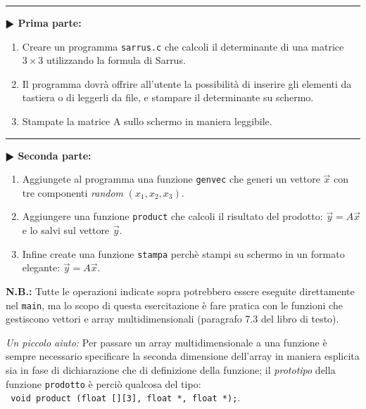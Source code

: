 \documentclass[11pt]{article}
\begin{document}
\vspace{2mm}
\hrule
\vspace{2mm}
\textbf{$\RHD$ Prima parte:}

\begin{enumerate}
\item Creare un programma \texttt{sarrus.c} che calcoli il determinante di una matrice $3 \times 3$ 
utilizzando la formula di Sarrus.
\item Il programma dovr\`a offrire all'utente la possibilit\`a di inserire gli elementi da tastiera 
o di leggerli da file, e stampare il determinante su schermo.
\item Stampate  la matrice A sullo schermo in maniera leggibile.
\end{enumerate}

\hrule
\vspace{2mm}
\textbf{$\RHD$ Seconda parte:}
\vspace{2mm}
\begin{enumerate}
\item
Aggiungete al programma una funzione \texttt{genvec} che generi un vettore $\vec{x}$ con tre componenti {\em random} 
$\left(x_1,x_2,x_3\right)$.
\item Aggiungere una funzione \texttt{product} che calcoli il risultato del prodotto: 
$\vec{y}=A \vec{x}$ e lo salvi sul vettore $\vec{y}$.
\item Infine create una funzione \texttt{stampa}  perch\`e stampi su schermo in un formato elegante:
$\vec{y}=A \vec{x}$.
\end{enumerate}
{\bf N.B.:} Tutte le operazioni indicate sopra potrebbero essere eseguite direttamente nel \texttt{main}, ma lo scopo
di questa esercitazione \`e fare pratica con le funzioni che gestiscono vettori e array multidimensionali (paragrafo 7.3
del libro di testo). 
\\
\begin{mdframed}[backgroundcolor=gray!10]
{\em Un piccolo aiuto:} Per passare un array multidimensionale a una funzione \`e sempre necessario specificare la seconda  dimensione dell'array in maniera esplicita sia in fase di dichiarazione che di definizione della funzione;
il {\em prototipo} della funzione \texttt{prodotto} \`e perci\`o qualcosa del tipo:
\\
\texttt{
void product (float [][3], float *, float *);}.
\end{mdframed}
\end{document}
